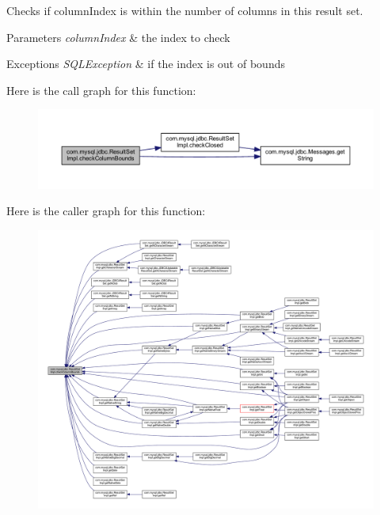 Checks if column\+Index is within the number of columns in this result set.


\begin{DoxyParams}{Parameters}
{\em column\+Index} & the index to check\\
\hline
\end{DoxyParams}

\begin{DoxyExceptions}{Exceptions}
{\em S\+Q\+L\+Exception} & if the index is out of bounds \\
\hline
\end{DoxyExceptions}
Here is the call graph for this function\+:
\nopagebreak
\begin{figure}[H]
\begin{center}
\leavevmode
\includegraphics[width=350pt]{classcom_1_1mysql_1_1jdbc_1_1_result_set_impl_a1ef4220e1860ea8f9ab89180466c2bde_cgraph}
\end{center}
\end{figure}
Here is the caller graph for this function\+:
\nopagebreak
\begin{figure}[H]
\begin{center}
\leavevmode
\includegraphics[width=350pt]{classcom_1_1mysql_1_1jdbc_1_1_result_set_impl_a1ef4220e1860ea8f9ab89180466c2bde_icgraph}
\end{center}
\end{figure}
\mbox{\label{classcom_1_1mysql_1_1jdbc_1_1_result_set_impl_a317dc47f2dc4149cd98ae2f1c5201821}} 
